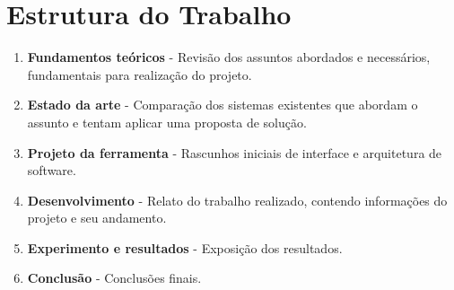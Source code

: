 \section{Estrutura do Trabalho}

\begin{enumerate}
\item \textbf{Fundamentos teóricos} - Revisão dos assuntos abordados e necessários, fundamentais para realização do projeto.
\item \textbf{Estado da arte} - Comparação dos sistemas existentes que abordam o assunto e tentam aplicar uma proposta de solução.
\item \textbf{Projeto da ferramenta} - Rascunhos iniciais de interface e arquitetura de software.
\item \textbf{Desenvolvimento} - Relato do trabalho realizado, contendo informações do projeto e seu andamento.
\item \textbf{Experimento e resultados} - Exposição dos resultados.
\item \textbf{Conclusão} - Conclusões finais.
\end{enumerate}
